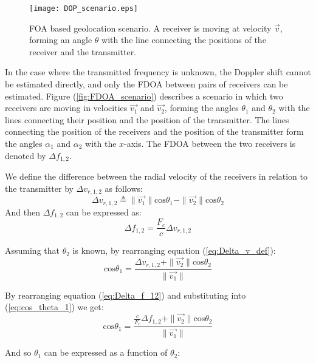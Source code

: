 \begin{figure}
\begin{center}
\texttt{[image: DOP\_scenario.eps]}
\end{center}
\caption{FOA based geolocation scenario. A receiver is moving at velocity $\vec{v}$, forming an angle $\theta$ with the line connecting the positions of the receiver and the transmitter.}
\label{fig:DOP_scenario}
\end{figure}


In the case where the transmitted frequency is unknown, the Doppler shift cannot be estimated directly, and only the FDOA between pairs of receivers can be estimated. Figure (\ref{fig:FDOA_scenario}) describes a scenario in which two receivers are moving in velocities $\vec{v_1}$ and $\vec{v_2}$, forming the angles $\theta_1$ and $\theta_2$ with the lines connecting their position and the position of the transmitter. The lines connecting the position of the receivers and the position of the transmitter form the angles $\alpha_1$ and $\alpha_2$ with the $x$-axis. The FDOA between the two receivers is denoted by $\Delta f_{1,2}$.

We define the difference between the radial velocity of the receivers in relation to the transmitter by $\Delta v_{r,1,2}$ as follows:
\begin{equation}
\label{eq:Delta_v_def}
\Delta v_{r,1,2} \triangleq \|\vec{v_1}\|\text{cos}\theta_1 - \|\vec{v_2}\|\text{cos}\theta_2
\end{equation}
And then $\Delta f_{1,2}$ can be expressed as:
\begin{equation}
\label{eq:Delta_f_12}
\Delta f_{1,2}= \frac{F_c}{c} \Delta v_{r,1,2}
\end{equation}

Assuming that $\theta_2$ is known, by rearranging equation (\ref{eq:Delta_v_def}):
\begin{equation}
\label{eq:cos_theta_1}
\text{cos}\theta_1 = \frac{\Delta v_{r,1,2} + \|\vec{v_2}\|\text{cos}\theta_2}{\|\vec{v_1}\|}
\end{equation}

By rearranging equation (\ref{eq:Delta_f_12}) and substituting into (\ref{eq:cos_theta_1}) we get:
\begin{equation}
\text{cos}\theta_1 = \frac{\frac{c}{F_c}\Delta f_{1,2} + \|\vec{v_2}\|\text{cos}\theta_2}{\|\vec{v_1}\|}
\end{equation}

And so $\theta_1$ can be expressed as a function of $\theta_2$:

